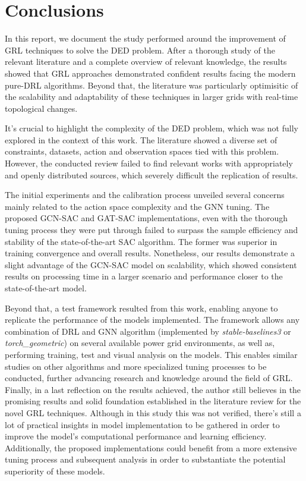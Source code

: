 \chapter{Conclusions} \label{chap:conclusion}


In this report, we document the study performed around the improvement of \ac{GRL} techniques to solve the \ac{DED} problem. After a thorough study of the relevant literature and a complete overview of relevant knowledge, the results showed that \ac{GRL} approaches demonstrated confident results facing the modern pure-\ac{DRL} algorithms. Beyond that, the literature was particularly optimisitic of the scalability and adaptability of these techniques in larger grids with real-time topological changes. \par
It's crucial to highlight the complexity of the \ac{DED} problem, which was not fully explored in the context of this work. The literature showed a diverse set of constraints, datasets, action and observation spaces tied with this problem. However, the conducted review failed to find relevant works with appropriately and openly distributed sources, which severely difficult the replication of results. \par
The initial experiments and the calibration process unveiled several concerns mainly related to the action space complexity and the \ac{GNN} tuning. The proposed GCN-SAC and GAT-SAC implementations, even with the thorough tuning process they were put through failed to surpass the sample efficiency and stability of the state-of-the-art \ac{SAC} algorithm. The former was superior in training convergence and overall results. Nonetheless, our results demonstrate a slight advantage of the GCN-SAC model on scalability, which showed consistent results on processing time in a larger scenario and performance closer to the state-of-the-art model. \par
Beyond that, a test framework resulted from this work, enabling anyone to replicate the performance of the models implemented. The framework allows any combination of \ac{DRL} and \ac{GNN} algorithm (implemented by \textit{stable-baselines3} or \textit{torch\_geometric}) on several available power grid environments, as well as, performing training, test and visual analysis on the models. This enables similar studies on other algorithms and more specialized tuning processes to be conducted, further advancing research and knowledge around the field of \ac{GRL}.
Finally, in a last reflection on the results achieved, the author still believes in the promising results and solid foundation established in the literature review for the novel \ac{GRL} techniques. Although in this study this was not verified, there's still a lot of practical insights in model implementation to be gathered in order to improve the model's computational performance and learning efficiency. Additionally, the proposed implementations could benefit from a more extensive tuning process and subsequent analysis in order to substantiate the potential superiority of these models.


